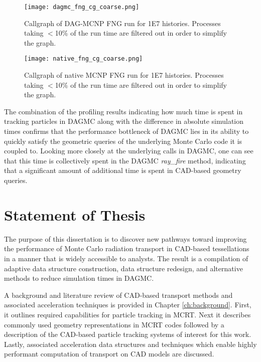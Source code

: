 \begin{figure}[H]
  \centering
  \caption[Callgraph of a DAG-MCNP simulation.]{Callgraph of DAG-MCNP FNG run for \num{1E7} histories. Processes taking
    $<$10\% of the run time are filtered out in order to simplify the graph.}
  \label{dagmc-fng-coarse}
  \texttt{[image: dagmc\_fng\_cg\_coarse.png]}
\end{figure}

\begin{figure}[H]
  \centering
  \caption[Callgraph of a native MCNP simulation.]{Callgraph of native MCNP FNG run for \num{1E7} histories. Processes taking
    $<$10\% of the run time are filtered out in order to simplify the graph.}
  \label{mcnp-fng-coarse}
  \texttt{[image: native\_fng\_cg\_coarse.png]}
\end{figure}

The combination of the profiling results indicating how much time is spent in
tracking particles in DAGMC along with the difference in absolute simulation times
confirms that the performance bottleneck of DAGMC lies in its ability to quickly
satisfy the geometric queries of the underlying Monte Carlo code it is coupled
to. Looking more closely at the underlying calls in DAGMC, one can see that this
time is collectively spent in the DAGMC \textit{ray\_fire} method,
indicating that a significant amount of additional time is spent in
CAD-based geometry queries.


\section{Statement of Thesis}

The purpose of this dissertation is to discover new pathways toward improving
the performance of Monte Carlo radiation transport in CAD-based tessellations in
a manner that is widely accessible to analysts. The result is a compilation of
adaptive data structure construction, data structure redesign, and alternative
methods to reduce simulation times in DAGMC.

A background and literature review of CAD-based transport methods and associated
acceleration techniques is provided in Chapter \ref{ch:background}. First, it
outlines required capabilities for particle tracking in MCRT. Next it describes 
commonly used geometry representations in MCRT codes followed by a description
of the CAD-based particle tracking systems of interest for this work. Lastly,
associated acceleration data structures and techniques which enable highly performant
computation of transport on CAD models are discussed.

